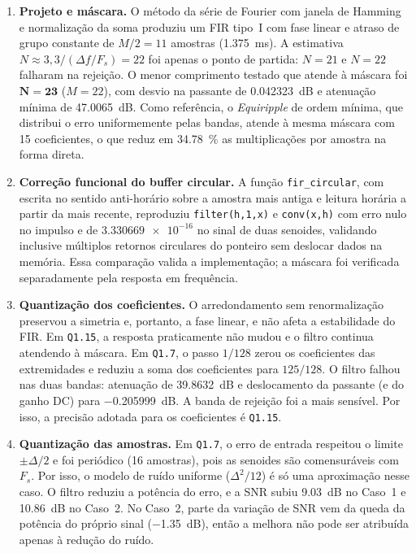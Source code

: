 \documentclass[11pt,a4paper]{article}
\begin{document}
\begin{enumerate}[label=\textbf{(\roman*)}, leftmargin=2.2em, itemsep=5pt]
    \item \textbf{Projeto e máscara.} O método da série de Fourier com janela de Hamming e normalização da soma produziu um FIR tipo~I com fase linear e atraso de grupo constante de $M/2 = 11$ amostras (\SI{1,375}{ms}). A estimativa $N \approx 3,3/(\Delta f/F_s) = 22$ foi apenas o ponto de partida: $N = 21$ e $N = 22$ falharam na rejeição. O menor comprimento testado que atende à máscara foi $\mathbf{N = 23}$ ($M = 22$), com desvio na passante de \SI{0,042323}{dB} e atenuação mínima de \SI{47,0065}{dB}. Como referência, o \textit{Equiripple} de ordem mínima, que distribui o erro uniformemente pelas bandas, atende à mesma máscara com 15 coeficientes, o que reduz em \SI{34,78}{\percent} as multiplicações por amostra na forma direta.

    \item \textbf{Correção funcional do buffer circular.} A função \texttt{fir\_circular}, com escrita no sentido anti-horário sobre a amostra mais antiga e leitura horária a partir da mais recente, reproduziu \texttt{filter(h,1,x)} e \texttt{conv(x,h)} com erro nulo no impulso e de $\num{3,330669e-16}$ no sinal de duas senoides, validando inclusive múltiplos retornos circulares do ponteiro sem deslocar dados na memória. Essa comparação valida a implementação; a máscara foi verificada separadamente pela resposta em frequência.

    \item \textbf{Quantização dos coeficientes.} O arredondamento sem renormalização preservou a simetria e, portanto, a fase linear, e não afeta a estabilidade do FIR. Em \texttt{Q1.15}, a resposta praticamente não mudou e o filtro continua atendendo à máscara. Em \texttt{Q1.7}, o passo $1/128$ zerou os coeficientes das extremidades e reduziu a soma dos coeficientes para $125/128$. O filtro falhou nas duas bandas: atenuação de \SI{39,8632}{dB} e deslocamento da passante (e do ganho DC) para \SI{-0,205999}{dB}. A banda de rejeição foi a mais sensível. Por isso, a precisão adotada para os coeficientes é \texttt{Q1.15}.

    \item \textbf{Quantização das amostras.} Em \texttt{Q1.7}, o erro de entrada respeitou o limite $\pm\Delta/2$ e foi periódico (16 amostras), pois as senoides são comensuráveis com $F_s$. Por isso, o modelo de ruído uniforme ($\Delta^2/12$) é só uma aproximação nesse caso. O filtro reduziu a potência do erro, e a SNR subiu \SI{+9,03}{dB} no Caso~1 e \SI{+10,86}{dB} no Caso~2. No Caso~2, parte da variação de SNR vem da queda da potência do próprio sinal (\SI{-1,35}{dB}), então a melhora não pode ser atribuída apenas à redução do ruído.


\end{enumerate}
\end{document}
